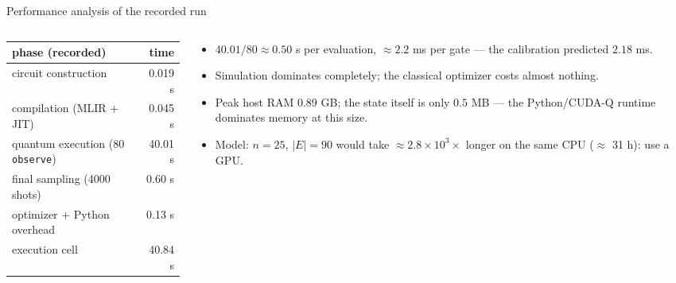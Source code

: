 \documentclass[aspectratio=169,11pt]{beamer}
\begin{document}
\begin{frame}{Performance analysis of the recorded run}
  \begin{columns}[T]
    \begin{column}{0.5\textwidth}
      \small
      \begin{center}
      \begin{tabular}{lr}
        \toprule phase (recorded) & time\\ \midrule
        circuit construction & 0.019 s\\
        compilation (MLIR + JIT) & 0.045 s\\
        quantum execution (80 \texttt{observe}) & 40.01 s\\
        final sampling (4000 shots) & 0.60 s\\
        optimizer + Python overhead & 0.13 s\\ \midrule
        execution cell & 40.84 s\\ \bottomrule
      \end{tabular}
      \end{center}
    \end{column}
    \begin{column}{0.46\textwidth}
      \small
      \begin{itemize}
        \item $40.01/80 \approx 0.50$ s per evaluation, $\approx 2.2$ ms per gate --- the calibration predicted $2.18$ ms.
        \item Simulation dominates completely; the classical optimizer costs almost nothing.
        \item Peak host RAM 0.89 GB; the state itself is only $0.5$ MB --- the Python/CUDA-Q runtime dominates memory at this size.
        \item Model: $n = 25$, $|E| = 90$ would take $\approx 2.8\times10^3\times$ longer on the same CPU ($\approx$ 31 h): use a GPU.
      \end{itemize}
    \end{column}
  \end{columns}
\end{frame}

\end{document}
